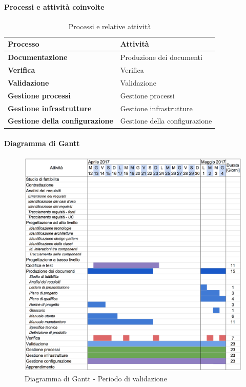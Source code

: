 		\paragraph{Processi e attività coinvolte}
			\begin{table}[H]
				\centering
				\begin{tabular}{ll}
					\toprule
					\textbf{Processo}                           & \textbf{Attività}              \\
					\midrule
					\textbf{Documentazione}            & Produzione dei documenti       \\
					\midrule
					\textbf{Verifica}                  & Verifica                       \\
					\midrule
					\textbf{Validazione}               & Validazione                    \\
					\midrule
					\textbf{Gestione processi} 					& Gestione processi              \\
					\midrule
					\textbf{Gestione infrastrutture}				& Gestione infrastrutture        \\
					\midrule
					\textbf{Gestione della configurazione}				& Gestione della configurazione        \\
					\bottomrule
				\end{tabular}
				\caption{Processi e relative attività}
				\label{Va-ProcessiAttività}
			\end{table}
		\paragraph{Diagramma di Gantt}
		\begin{figure}[H]
			\centering
			\includegraphics[width=\textwidth]{img/Gantt/g4c.png}
			\caption{Diagramma di Gantt - Periodo di validazione}
		\end{figure}
